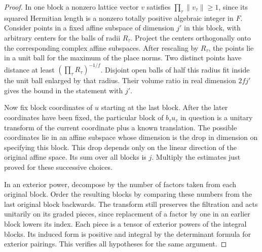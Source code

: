 \documentclass[a4paper,11pt]{article}
\theoremstyle{definition}
\theoremstyle{remark}
\numberwithin{equation}{section}
\begin{document}
\begin{proof}
In one block a nonzero lattice vector \(v\) satisfies
\(\prod_\tau\|v_\tau\|\ge1\), since its squared Hermitian length
is a nonzero totally positive algebraic integer in \(F\).
Consider points in a fixed affine subspace of dimension \(j'\)
in this block, with arbitrary centers for the balls of radii
\(R_\tau\). Project the centers orthogonally onto the corresponding
complex affine subspaces. After rescaling by \(R_\tau\), the
points lie in a unit ball for the maximum of the place norms.
Two distinct points have distance at least
\((\prod_\tau R_\tau)^{-1/f}\). Disjoint open balls of half
this radius fit inside the unit ball enlarged by that radius.
Their volume ratio in real dimension \(2fj'\) gives the bound
in the statement with \(j'\).

Now fix block coordinates of \(u\) starting at the last block.
After the later coordinates have been fixed, the particular
block of \(b_\tau u_\tau\) in question is a unitary transform of
the current coordinate plus a known translation. The possible
coordinates lie in an affine subspace whose dimension is the
drop in dimension on specifying this block. This drop depends
only on the linear direction of the original affine space. Its
sum over all blocks is \(j\). Multiply the estimates just proved
for these successive choices.

In an exterior power, decompose by the number of factors taken
from each original block. Order the resulting blocks by comparing
these numbers from the last original block backwards. The
transform still preserves the filtration and acts unitarily
on its graded pieces, since replacement of a factor by one in
an earlier block lowers its index. Each piece is a tensor of
exterior powers of the integral blocks. Its induced form is
positive and integral by the determinant formula for exterior
pairings. This verifies all hypotheses for the same argument.
\end{proof}
\end{document}

